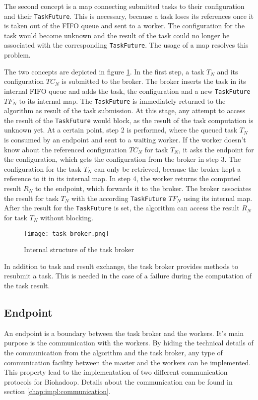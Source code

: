 The second concept is a map connecting submitted tasks to their configuration and their \texttt{TaskFuture}. This is necessary, because a task loses its references once it is taken out of the FIFO queue and sent to a worker. The configuration for the task would become unknown and the result of the task could no longer be associated with the corresponding \texttt{TaskFuture}. The usage of a map resolves this problem.

The two concepts are depicted in figure \ref{fig:task-broker}. In the first step, a task $T_N$ and its configuration $TC_N$ is submitted to the broker. The broker inserts the task in its internal FIFO queue and adds the task, the configuration and a new \texttt{TaskFuture} $TF_N$ to its internal map. The \texttt{TaskFuture} is immediately returned to the algorithm as result of the task submission. At this stage, any attempt to access the result of the \texttt{TaskFuture} would block, as the result of the task computation is unknown yet. At a certain point, step 2 is performed, where the queued task $T_N$ is consumed by an endpoint and sent to a waiting worker. If the worker doesn't know about the referenced configuration $TC_N$ for task $T_N$, it asks the endpoint for the configuration, which gets the configuration from the broker in step 3. The configuration for the task $T_N$ can only be retrieved, because the broker kept a reference to it in its internal map. In step 4, the worker returns the computed result $R_N$ to the endpoint, which forwards it to the broker. The broker associates the result for task $T_N$ with the according \texttt{TaskFuture} $TF_N$ using its internal map. After the result for the \texttt{TaskFuture} is set, the algorithm can access the result $R_N$ for task $T_N$ without blocking.

\begin{figure}
  \centering
  \texttt{[image: task-broker.png]}
  \caption[Internal structure of the task broker]{Internal structure of the task broker}
  \label{fig:task-broker}
\end{figure}

In addition to task and result exchange, the task broker provides methods to resubmit a task. This is needed in the case of a failure during the computation of the task result.

\subsection{Endpoint}
\label{chap:impl:endpoint}
An endpoint is a boundary between the task broker and the workers. It's main purpose is the communication with the workers. By hiding the technical details of the communication from the algorithm and the task broker, any type of communication facility between the master and the workers can be implemented. This property lead to the implementation of two different communication protocols for Biohadoop. Details about the communication can be found in section \ref{chap:impl:communication}.

